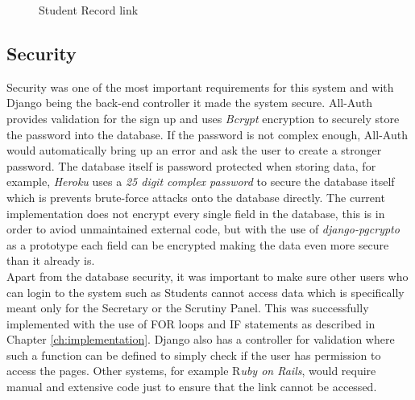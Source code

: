 \documentclass[../main.tex]{subfiles}
\begin{document}
\begin{figure}[H]
        \caption{\label{fig:studlink} Student Record link}
      \end{figure}
      
\subsection*{Security}  
Security was one of the most important requirements for this system and with Django being the back-end controller it made the system secure. All-Auth\cite{allauth} provides validation for the sign up and uses \textit{Bcrypt} \cite{bcrypt} encryption to securely store the password into the database. If the password is not complex enough, All-Auth would automatically bring up an error and ask the user to create a stronger password. The database itself is password protected when storing data, for example, \textit{Heroku} uses a \textit{25 digit complex password} to secure the database itself which is prevents brute-force attacks onto the database directly. The current implementation does not encrypt every single field in the database, this is in order to aviod unmaintained external code, but with the use of \textit{django-pgcrypto}\cite{dbencrypt} as a prototype each field can be encrypted making the data even more secure than it already is. \\[4mm]

Apart from the database security, it was important to make sure other users who can login to the system such as Students cannot access data which is specifically meant only for the Secretary or the Scrutiny Panel. This was successfully implemented with the use of FOR loops and IF statements as described in Chapter \ref{ch:implementation}. Django also has a controller for validation where such a function can be defined to simply check if the user has permission to access the pages. Other systems, for example R\textit{uby on Rails}, would require manual and extensive code just to ensure that the link cannot be accessed. \\[4mm]
\end{document}
